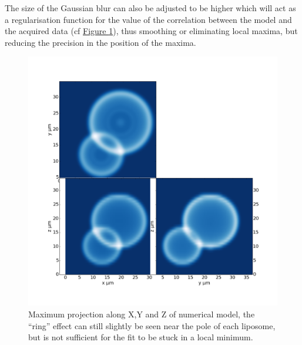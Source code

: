 \documentclass[A4paperpaper,11pt,english]{sphinxmanual}
\begin{document}
The size of the
Gaussian blur can also be adjusted to be higher which will act as a regularisation
function for the value of the correlation between the model and the acquired
data (cf \hyperref[parts/part4:max-proj-model]{Figure  \ref*{parts/part4:max-proj-model}}), thus smoothing or eliminating local maxima,
but reducing the precision in the position of the maxima.
\begin{figure}[htbp]
\centering
\capstart

\includegraphics[width=0.700\linewidth]{max_proj_model.png}
\caption{Maximum projection along X,Y and Z of numerical model, the ``ring'' effect
can still slightly be seen near the pole of each liposome, but is not
sufficient for the fit to be stuck in a local minimum.}\label{parts/part4:max-proj-model}\end{figure}
\end{document}
